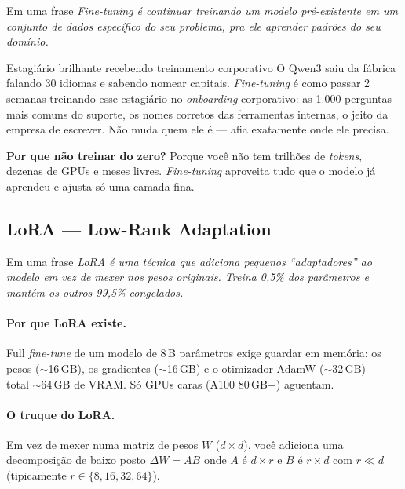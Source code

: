 \documentclass[11pt,a4paper]{article}
\begin{document}
\begin{infobox}{Em uma frase}
\emph{Fine-tuning é continuar treinando um modelo pré-existente em um
conjunto de dados específico do seu problema, pra ele aprender padrões
do seu domínio.}
\end{infobox}

\begin{analogia}{Estagiário brilhante recebendo treinamento corporativo}
O Qwen3 saiu da fábrica falando 30 idiomas e sabendo nomear capitais.
\emph{Fine-tuning} é como passar 2 semanas treinando esse estagiário
no \emph{onboarding} corporativo: as 1.000 perguntas mais comuns do
suporte, os nomes corretos das ferramentas internas, o jeito da
empresa de escrever. Não muda quem ele é --- afia exatamente onde ele
precisa.
\end{analogia}

\textbf{Por que não treinar do zero?} Porque você não tem trilhões
de \emph{tokens}, dezenas de GPUs e meses livres. \emph{Fine-tuning}
aproveita tudo que o modelo já aprendeu e ajusta só uma camada fina.

\subsection{LoRA --- Low-Rank Adaptation}

\begin{infobox}{Em uma frase}
\emph{LoRA é uma técnica que \emph{adiciona} pequenos ``adaptadores''
ao modelo em vez de mexer nos pesos originais. Treina 0,5\% dos
parâmetros e mantém os outros 99,5\% congelados.}
\end{infobox}

\paragraph{Por que LoRA existe.} Full \emph{fine-tune} de um modelo de
8\,B parâmetros exige guardar em memória: os pesos ($\sim$16\,GB), os
gradientes ($\sim$16\,GB) e o otimizador AdamW ($\sim$32\,GB) ---
total $\sim$64\,GB de VRAM. Só GPUs caras (A100 80\,GB+) aguentam.

\paragraph{O truque do LoRA.} Em vez de mexer numa matriz de pesos
$W$ ($d \times d$), você adiciona uma decomposição de baixo posto
$\Delta W = AB$ onde $A$ é $d \times r$ e $B$ é $r \times d$ com
$r \ll d$ (tipicamente $r \in \{8, 16, 32, 64\}$).
\end{document}
